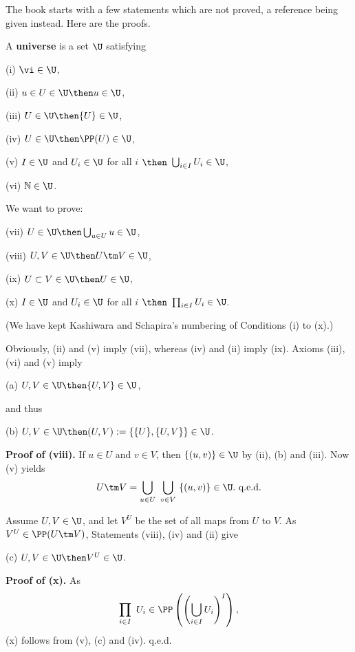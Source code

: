 \documentclass[12pt]{article}
\theoremstyle{remark}
\theoremstyle{definition}
\begin{document}

The book starts with a few statements which are not proved, a reference being given instead. Here are the proofs.

A \textbf{universe} is a set $\U$ satisfying 

(i) $\vi\in\U$,

(ii) $u\in U\in\U\then u\in\U$,

(iii) $U\in\U\then\{U\}\in\U$,

(iv) $U\in\U\then\PP(U)\in\U$,

(v) $I\in\U$ and $U_i\in\U$ for all $i$ $\then$ $\bigcup_{i\in I}U_i\in\U$,

(vi) $\mathbb N\in\U$.

\nn We want to prove:

(vii) $U\in\U\then\bigcup_{u\in U}u\in\U$,

(viii) $U,V\in\U\then U\tm V\in\U$,

(ix) $U\subset V\in\U\then U\in\U$,

(x) $I\in\U$ and $U_i\in\U$ for all $i$ $\then$ $\prod_{i\in I}U_i\in\U$.

\nn(We have kept Kashiwara and Schapira's numbering of Conditions (i) to (x).) 

\nn Obviously, (ii) and (v) imply (vii), whereas (iv) and (ii) imply (ix). Axioms (iii), (vi) and (v) imply

(a) $U,V\in\U\then\{U,V\}\in\U$,

\nn and thus

(b) $U,V\in\U\then(U,V):=\{\{U\},\{U,V\}\}\in\U$.

\nn\textbf{Proof of (viii).} If $u\in U$ and $v\in V$, then $\{(u,v)\}\in\U$ by (ii), (b) and (iii). Now (v) yields 
$$
U\tm V=\bigcup_{u\in U}\ \bigcup_{v\in V}\ \{(u,v)\}\in\U.\text{ q.e.d.} 
$$ 

Assume $U,V\in\U$, and let $V^U$ be the set of all maps from $U$ to $V$. As $V^U\in\PP(U\tm V)$, Statements (viii), (iv) and (ii) give

(c) $U,V\in\U\then V^U\in\U$.

\nn\textbf{Proof of (x).} As 
$$
\prod_{i\in I}\ U_i\in\PP\left(\left(\bigcup_{i\in I}U_i\right)^I\right),
$$
(x) follows from (v), (c) and (iv). q.e.d.


\end{document}
